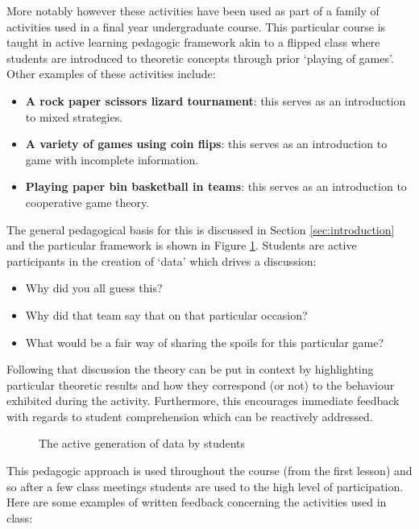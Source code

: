 \documentclass[12pt, a4paper]{article}
\begin{document}
More notably however these activities have been used as part of a family of
activities used in a final year undergraduate course. This particular course is
taught in active learning pedagogic framework akin to a flipped class where
students are introduced to theoretic concepts through prior `playing of games'.
Other examples of these activities include:

\begin{itemize}
    \item \textbf{A rock paper scissors lizard tournament}: this serves as an
        introduction to mixed strategies.
    \item \textbf{A variety of games using coin flips}: this serves as an
        introduction to game with incomplete information.
    \item \textbf{Playing paper bin basketball in teams}: this serves as an
        introduction to cooperative game theory.
\end{itemize}

The general pedagogical basis for this is discussed in Section
\ref{sec:introduction} and the particular framework is shown in Figure
\ref{fig:use_of_data}. Students are active participants in the creation of
`data' which drives a discussion:

\begin{itemize}
    \item Why did you all guess this?
    \item Why did that team say that on that particular occasion?
    \item What would be a fair way of sharing the spoils for this particular
        game?
\end{itemize}

Following that discussion the theory can be put in context by highlighting
particular theoretic results and how they correspond (or not) to the behaviour
exhibited during the activity. Furthermore, this encourages immediate
feedback with regards to student comprehension which can be reactively
addressed.

\begin{figure}[!hbtp]
    \centering
    
    \caption{The active generation of data by students}
    \label{fig:use_of_data}
\end{figure}

This pedagogic approach is used throughout the course (from the first lesson)
and so after a few class meetings students are used to the high level of
participation. Here are some examples of written feedback concerning the
activities used in class:
\end{document}
